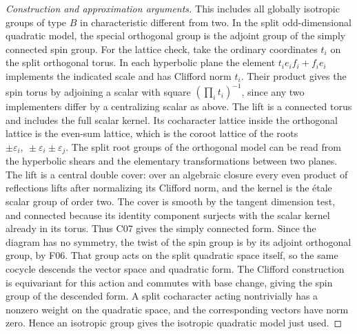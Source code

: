 \documentclass[11pt,a4paper,openany,oneside]{book}
\theoremstyle{resultstyle}
\theoremstyle{definition}
\numberwithin{equation}{chapter}
\begin{document}
\begin{proof}[Construction and approximation arguments]
This includes all globally isotropic groups of type \(B\)
in characteristic different from two. In the split odd-dimensional
quadratic model, the special orthogonal group is the adjoint group
of the simply connected spin group. For the lattice check, take
the ordinary coordinates \(t_i\) on the split orthogonal torus.
In each hyperbolic plane the element \(t_i e_i f_i+f_i e_i\)
implements the indicated scale and has Clifford norm \(t_i\).
Their product gives the spin torus by adjoining a scalar with
square \((\prod_i t_i)^{-1}\), since any two implementers differ
by a centralizing scalar as above. The lift is a connected
torus and includes the full scalar kernel. Its cocharacter
lattice inside the orthogonal lattice is the even-sum lattice,
which is the coroot lattice of the roots
\(\pm\varepsilon_i,\ \pm\varepsilon_i\pm\varepsilon_j\).
The split root groups of the orthogonal model can be read
from the hyperbolic shears and the elementary transformations
between two planes. The lift is a central double cover:
over an algebraic closure every even product of reflections
lifts after normalizing its Clifford norm, and the kernel is
the étale scalar group of order two. The cover is smooth by
the tangent dimension test, and connected because its identity
component surjects with the scalar kernel already in its torus.
Thus C07 gives the simply connected form. Since the diagram
has no symmetry, the twist of the spin group is by its adjoint
orthogonal group, by F06. That group acts on the split quadratic
space itself, so the same cocycle descends the vector space and
quadratic form. The Clifford construction is equivariant for
this action and commutes with base change, giving the spin
group of the descended form. A split cocharacter acting
nontrivially has a nonzero weight on the quadratic space,
and the corresponding vectors have norm zero. Hence an
isotropic group gives the isotropic quadratic model just used.


\end{proof}
\end{document}
